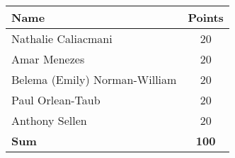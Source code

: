 	\begin{center}
	\begin{tabular}{| l | c |}
		\hline
		\textbf{Name}					&	\textbf{Points} \\ \hline
		Nathalie Caliacmani				&	20				\\ \hline
		Amar Menezes					&	20				\\ \hline
		Belema (Emily) Norman-William	&	20				\\ \hline
		Paul Orlean-Taub				&	20				\\ \hline
		Anthony Sellen					&	20				\\ \hline
		\textbf{Sum}					&	\textbf{100}	\\
		\hline
	\end{tabular}
	\end{center}